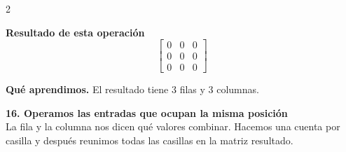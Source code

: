 \documentclass[11pt,a4paper,landscape]{article}
\begin{document}
\begin{multicols*}{2}
\begin{minipage}{\linewidth}
\par{}\par\smallskip
\par\smallskip \textbf{Resultado de esta operación}\[\begin{bmatrix}0 & 0 & 0\\0 & 0 & 0\\0 & 0 & 0\end{bmatrix}\]
\par\smallskip\textbf{Qué aprendimos.} El resultado tiene 3 filas y 3 columnas.
\end{minipage}\par\medskip
\noindent\begin{minipage}{\linewidth}\textbf{16. Operamos las entradas que ocupan la misma posición}\\[2pt]La fila y la columna nos dicen qué valores combinar. Hacemos una cuenta por casilla y después reunimos todas las casillas en la matriz resultado.

\end{minipage}
\end{multicols*}
\end{document}
